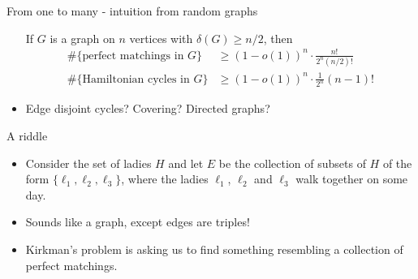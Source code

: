 \documentclass{beamer}
\theoremstyle{plain}
\begin{document}
	\begin{frame}{From one to many - intuition from random graphs}
		\begin{itemize}
			\begin{theorem}
				If $G$ is a graph on $n$ vertices with $\delta(G) \geq n/2$, then
				\begin{align*}
					\#\{\text{perfect matchings in }G\} &\geq (1-o(1))^n\cdot \frac{n!}{2^n(n/2)!}\\
					\#\{\text{Hamiltonian cycles in }G\} &\geq (1-o(1))^n\cdot \frac{1}{2^n}(n-1)!
				\end{align*}
			\end{theorem}

			\pause

			\item Edge disjoint cycles? Covering? Directed graphs?

		\end{itemize}	
	\end{frame}


	\begin{frame}{A riddle}
		\begin{itemize}
			\begin{problem}[T. Kirkman - 1850] %
				Fifteen young ladies in a school walk out three abreast seven days in succession: it is required to arrange them daily so that no two shall walk twice abreast.
			\end{problem}

			\pause

			\item Consider the set of ladies $H$ and let $E$ be the collection of subsets of $H$ of the form $\{\ell_1, \ell_2, \ell_3\}$, where the ladies $\ell_1$, $\ell_2$ and $\ell_3$ walk together on some day.

			\pause

			\item Sounds like a graph, except edges are triples!

			\pause 

			\item Kirkman's problem is asking us to find something resembling a collection of perfect matchings.
		\end{itemize}
	\end{frame}
\end{document}
